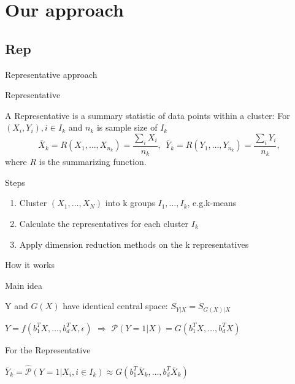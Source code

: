 \documentclass[ignorenonframetext,]{beamer}
\providecommand{\tightlist}{%
  \setlength{\itemsep}{0pt}\setlength{\parskip}{0pt}}
\begin{document}
\section{Our approach}\label{our-approach}

\subsection{Rep}\label{rep}

\begin{frame}{Representative approach}

\begin{block}{Representative}

A Representative is a summary statistic of data points within a cluster:
For \((X_i, Y_i), i \in I_k\) and \(n_k\) is sample size of \(I_k\) \[
  \bar{X}_k = R(X_{1}, \dots, X_{n_k}) = \frac{\sum_i X_i}{n_k},~~ \bar{Y}_k = R(Y_{1}, \dots, Y_{n_k}) = \frac{\sum_i Y_i}{n_k},
\] where \(R\) is the summarizing function.

\end{block}

\begin{block}{Steps}

\begin{enumerate}
\def\labelenumi{\arabic{enumi}.}
\tightlist
\item
  Cluster \((X_1, \dots,X_N)\) into k groups \(I_1, \dots, I_k\),
  e.g.k-means
\item
  Calculate the representatives for each cluster \(I_k\)
\item
  Apply dimension reduction methods on the k representatives
\end{enumerate}

\end{block}

\end{frame}

\begin{frame}{How it works}

\begin{block}{Main idea}

Y and \(G(X)\) have identical central space: \(S_{Y|X} = S_{G(X)|X}\)

\begin{center}
$Y = f(b_1^TX, \dots, b_d^TX,\epsilon)$
$\Rightarrow$
$\mathcal{P}(Y = 1 |X) = G(b_1^TX, \dots, b_d^TX)$
\end{center}

\end{block}

\begin{block}{For the Representative}

\begin{center}
$\bar{Y}_k = \hat{\mathcal{P}}(Y = 1|X_i, i\in I_k) \approx G(b_1^T\bar{X}_k, \dots, b_d^T\bar{X}_k)$
\end{center}

\end{block}

\end{frame}
\end{document}
